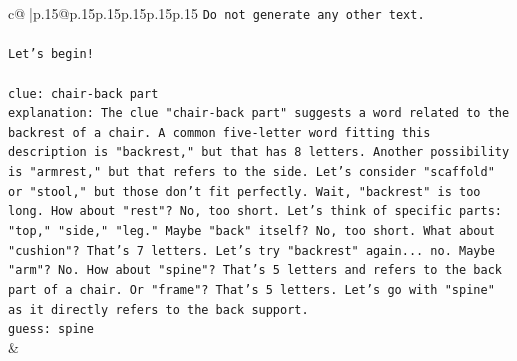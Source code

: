 \documentclass{article}
\begin{document}
{\begin{supertabular}{c@{$\;$}|p{.15\linewidth}@{}p{.15\linewidth}p{.15\linewidth}p{.15\linewidth}p{.15\linewidth}p{.15\linewidth}}
{{{\texttt{Do not generate any other text.} \\
\\ 
\texttt{Let's begin!} \\
\\ 
\texttt{clue: chair{-}back part} \\
\texttt{explanation: The clue "chair{-}back part" suggests a word related to the backrest of a chair. A common five{-}letter word fitting this description is "backrest," but that has 8 letters. Another possibility is "armrest," but that refers to the side. Let's consider "scaffold" or "stool," but those don't fit perfectly. Wait, "backrest" is too long. How about "rest"? No, too short. Let's think of specific parts: "top," "side," "leg." Maybe "back" itself? No, too short. What about "cushion"? That's 7 letters. Let's try "backrest" again... no. Maybe "arm"? No. How about "spine"? That's 5 letters and refers to the back part of a chair. Or "frame"? That's 5 letters. Let's go with "spine" as it directly refers to the back support.} \\
\texttt{guess: spine} \\
            }
        }
    }
    & \\ \\


\end{supertabular}}
\end{document}
